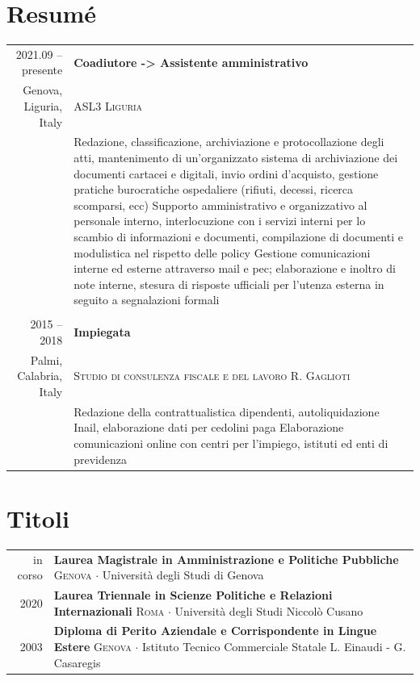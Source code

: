 \documentclass[11pt, a4paper]{article}
\newlength{\headerheight}
\newlength{\rightcolwidth}
\newcommand{\cvevent}[5]{
  \footnotesize{#1} & \textbf{#2} \\
  \footnotesize{#4 \color{cvred}\faMapMarker} & \footnotesize\textsc{#3} \\
  & \color{black!70}\footnotesize{#5}
}
\newcommand{\cvdegree}[4]{
  {#1} & \textbf{#2} \newline \textsc{#3} $\cdot$ {#4 {\color{headerblue}\phantom{i}\footnotesize ~\faUniversity}}
}
\begin{document}
\begin{bgbox}[height=\paperheight-\headerheight,width=\rightcolwidth,colback=white]
  \section*{Resumé}
  \begin{tabular}{r | p{}}
    \cvevent{2021.09 -- presente}{Coadiutore -> Assistente amministrativo}{ASL3 Liguria}{Genova, Liguria, Italy}{Redazione, classificazione, archiviazione e protocollazione degli atti, mantenimento di un'organizzato sistema di archiviazione dei documenti cartacei e digitali, invio ordini d'acquisto, gestione pratiche burocratiche ospedaliere (rifiuti, decessi, ricerca scomparsi, ecc) \newline Supporto amministrativo e organizzativo al personale interno, interlocuzione con i servizi interni per lo scambio di informazioni e documenti, compilazione di documenti e modulistica nel rispetto delle policy \newline Gestione comunicazioni interne ed esterne attraverso mail e pec; elaborazione e inoltro di note interne, stesura di risposte ufficiali per l'utenza esterna in seguito a segnalazioni formali} \\ \\
    \cvevent{2015 -- 2018}{Impiegata}{Studio di consulenza fiscale e del lavoro R. Gaglioti}{Palmi, Calabria, Italy}{Redazione della contrattualistica dipendenti, autoliquidazione Inail, elaborazione dati per cedolini paga \newline Elaborazione comunicazioni online con centri per l'impiego, istituti ed enti di previdenza}
  \end{tabular}

  \vspace{1em}

  \section*{Titoli}
  \footnotesize
  \begin{tabular}{r p{}}
    \cvdegree{in corso}{Laurea Magistrale in Amministrazione e Politiche Pubbliche}{Genova}{Università degli Studi di Genova} \\
    \cvdegree{2020}{Laurea Triennale in Scienze Politiche e Relazioni Internazionali}{Roma}{Università degli Studi Niccolò Cusano} \\
    \cvdegree{2003}{Diploma di Perito Aziendale e Corrispondente in Lingue Estere}{Genova}{Istituto Tecnico Commerciale Statale L. Einaudi - G. Casaregis} \\
  \end{tabular}


\end{bgbox}
\end{document}
